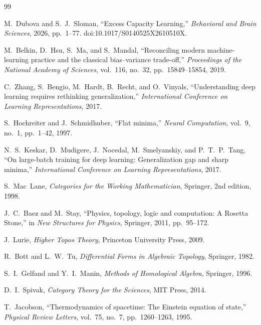 \documentclass[12pt,oneside]{article}
\theoremstyle{plain}
\theoremstyle{definition}
\theoremstyle{remark}
\begin{document}
\newpage
\begin{thebibliography}{99}

M.~Dubova and S.~J.~Sloman,
\newblock ``Excess Capacity Learning,''
\newblock \emph{Behavioral and Brain Sciences}, 2026, pp.~1--77.
\newblock doi:10.1017/S0140525X2610510X.

M.~Belkin, D.~Hsu, S.~Ma, and S.~Mandal,
\newblock ``Reconciling modern machine-learning practice and the classical
  bias--variance trade-off,''
\newblock \emph{Proceedings of the National Academy of Sciences}, vol.~116,
  no.~32, pp.~15849--15854, 2019.

C.~Zhang, S.~Bengio, M.~Hardt, B.~Recht, and O.~Vinyals,
\newblock ``Understanding deep learning requires rethinking generalization,''
\newblock \emph{International Conference on Learning Representations}, 2017.

S.~Hochreiter and J.~Schmidhuber,
\newblock ``Flat minima,''
\newblock \emph{Neural Computation}, vol.~9, no.~1, pp.~1--42, 1997.

N.~S.~Keskar, D.~Mudigere, J.~Nocedal, M.~Smelyanskiy, and P.~T.~P.~Tang,
\newblock ``On large-batch training for deep learning: Generalization gap and
  sharp minima,''
\newblock \emph{International Conference on Learning Representations}, 2017.

S.~Mac~Lane,
\newblock \emph{Categories for the Working Mathematician},
\newblock Springer, 2nd edition, 1998.

J.~C.~Baez and M.~Stay,
\newblock ``Physics, topology, logic and computation: A Rosetta Stone,''
\newblock in \emph{New Structures for Physics}, Springer, 2011, pp.~95--172.

J.~Lurie,
\newblock \emph{Higher Topos Theory},
\newblock Princeton University Press, 2009.

R.~Bott and L.~W.~Tu,
\newblock \emph{Differential Forms in Algebraic Topology},
\newblock Springer, 1982.

S.~I.~Gelfand and Y.~I.~Manin,
\newblock \emph{Methods of Homological Algebra},
\newblock Springer, 1996.

D.~I.~Spivak,
\newblock \emph{Category Theory for the Sciences},
\newblock MIT Press, 2014.

T.~Jacobson,
\newblock ``Thermodynamics of spacetime: The Einstein equation of state,''
\newblock \emph{Physical Review Letters}, vol.~75, no.~7, pp.~1260--1263,
  1995.


\end{thebibliography}
\end{document}
